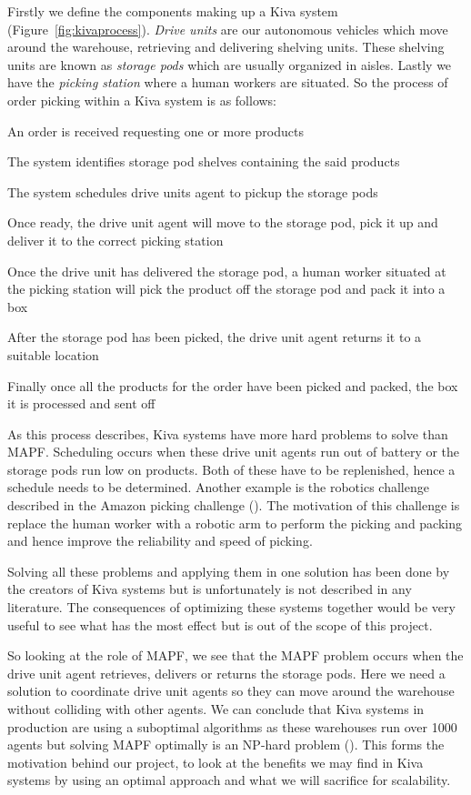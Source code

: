 \documentclass[a4paper,11pt]{article}
\begin{document}
Firstly we define the components making up a Kiva system (Figure~\ref{fig:kivaprocess}). \textit{Drive units} are our autonomous vehicles which move around the warehouse, retrieving and delivering shelving units. These shelving units are known as \textit{storage pods} which are usually organized in aisles. Lastly we have the \textit{picking station} where a human workers are situated. So the process of order picking within a Kiva system is as follows:
\begin{compactenum}
	\item An order is received requesting one or more products
	\item The system identifies storage pod shelves containing the said products
	\item The system schedules drive units agent to pickup the storage pods
	\item Once ready, the drive unit agent will move to the storage pod, pick it up and deliver it to the correct picking station
	\item Once the drive unit has delivered the storage pod, a human worker situated at the picking station will pick the product off the storage pod and pack it into a box
	\item After the storage pod has been picked, the drive unit agent returns it to a suitable location
	\item Finally once all the products for the order have been picked and packed, the box it is processed and sent off
\end{compactenum}

\noindent As this process describes, Kiva systems have more hard problems to solve than MAPF. Scheduling occurs when these drive unit agents run out of battery or the storage pods run low on products. Both of these have to be replenished, hence a schedule needs to be determined. Another example is the robotics challenge described in the Amazon picking challenge (\cite{correll2016lessons}). The motivation of this challenge is replace the human worker with a robotic arm to perform the picking and packing and hence improve the reliability and speed of picking. 

Solving all these problems and applying them in one solution has been done by the creators of Kiva systems but is unfortunately is not described in any literature. The consequences of optimizing these systems together would be very useful to see what has the most effect but is out of the scope of this project.

So looking at the role of MAPF, we see that the MAPF problem occurs when the drive unit agent retrieves, delivers or returns the storage pods. Here we need a solution to coordinate drive unit agents so they can move around the warehouse without colliding with other agents. We can conclude that Kiva systems in production are using a suboptimal algorithms as these warehouses run over 1000 agents but solving MAPF optimally is an NP-hard problem (\cite{yu2013structure}). This forms the motivation behind our project, to look at the benefits we may find in Kiva systems by using an optimal approach and what we will sacrifice for scalability.
\end{document}
